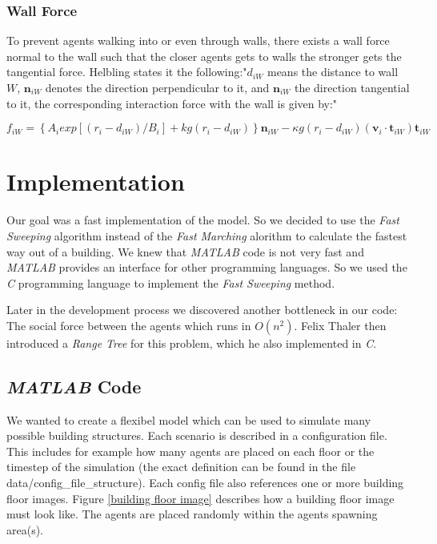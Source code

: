 \documentclass[11pt]{article}
\begin{document}
\subsubsection{Wall Force}

To prevent agents walking into or even through walls, there exists a wall force normal to the wall such that the closer agents gets to walls the stronger gets the tangential force.
Helbling states it the following:"$d_{iW}$ means the distance to wall $W$, $\mathbf{n}_{iW}$ denotes  the direction perpendicular to it, and $\mathbf{n}_{iW}$ the direction tangential to it, the corresponding interaction force with the wall is given by:" \cite{SFMPD}

\begin{equation}
f_{iW}=\left\{A_{i}exp[(r_{i}-d_{iW})/B_{i}]+kg(r_{i}-d_{iW})\right\}\mathbf{n}_{iW}-\kappa g(r_{i}-d_{iW})(\mathbf{v}_{i}\cdot\mathbf{t}_{iW})\mathbf{t}_{iW}
\end{equation}

\section{Implementation}\label{implementation}
Our goal was a fast implementation of the model. So we decided to use the
\textit{Fast Sweeping} algorithm instead of the \textit{Fast Marching} alorithm
to calculate the fastest way out of a building. We knew that \textit{MATLAB}
code is not very fast and \textit{MATLAB} provides an interface for other
programming languages. So we used the \textit{C} programming language to
implement the \textit{Fast Sweeping} method.

Later in the development process we discovered another bottleneck in our code:
The social force between the agents which runs in $ O(n^2) $. Felix Thaler then
introduced a \textit{Range Tree} for this problem, which he also implemented in
\textit{C}.


\subsection{\textit{MATLAB} Code} \label{matlab code}
We wanted to create a flexibel model which can be used to simulate many
possible building structures.
Each scenario is described in a configuration file. This includes for example how many
agents are placed on each floor or the timestep of the simulation (the exact
definition can be found in the file data/config\_file\_structure). Each config
file also references one or more building floor images.
Figure \vref{building floor image} describes how a building floor
image must look like. The agents are placed randomly within the agents spawning
area(s).
\end{document}
